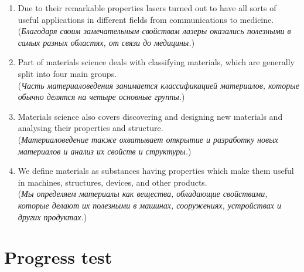 \begin{enumerate}
      \item Due to their remarkable properties lasers turned out to have all sorts of useful applications in different fields from communications to medicine.\\
            (\textit{Благодаря своим замечательным свойствам лазеры оказались полезными в самых разных областях, от связи до медицины.})

      \item Part of materials science deals with classifying materials, which are generally split into four main groups.\\
            (\textit{Часть материаловедения занимается классификацией материалов, которые обычно делятся на четыре основные группы.})

      \item Materials science also covers discovering and designing new materials and analysing their properties and structure.\\
            (\textit{Материаловедение также охватывает открытие и разработку новых материалов и анализ их свойств и структуры.})

      \item We define materials as substances having properties which make them useful in machines, structures, devices, and other products.\\
            (\textit{Мы определяем материалы как вещества, обладающие свойствами, которые делают их полезными в машинах, сооружениях, устройствах и других продуктах.})
\end{enumerate}

\section{Progress test}


